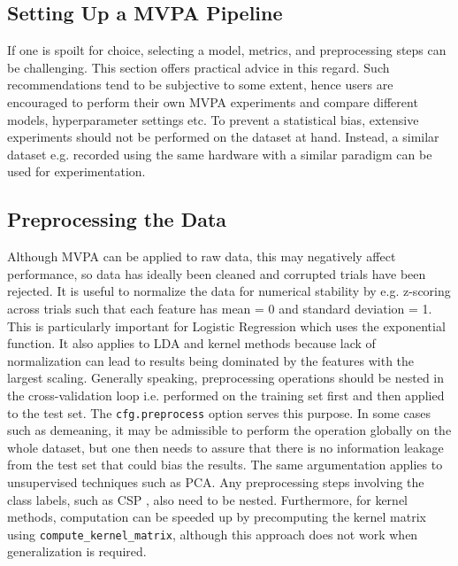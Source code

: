 \documentclass[utf8]{frontiersSCNS} %
\newcommand{\ttt}[1]{\texttt{#1}}
\begin{document}

\subsection{Setting Up a MVPA Pipeline}

If one is spoilt for choice, selecting  a model, metrics, and preprocessing steps can be challenging. This section offers practical advice in this regard. Such recommendations tend to be subjective to some extent, hence users are encouraged to perform their own MVPA experiments and compare different models, hyperparameter settings etc. To prevent a statistical bias, extensive experiments should not be performed on the dataset at hand. Instead, a similar dataset e.g. recorded using the same hardware with a similar paradigm can be used for experimentation.\\

\subsection{Preprocessing the Data} 

Although MVPA can be applied to raw data, this may negatively affect performance, so data has ideally been cleaned and corrupted trials have been rejected. It is useful to normalize the data for numerical stability by e.g. z-scoring across trials such that each feature has mean = 0 and standard deviation = 1. This is particularly important for Logistic Regression which uses the exponential function. It also applies to LDA and kernel methods because lack of normalization can lead to results being dominated by the features with the largest scaling. Generally speaking, preprocessing operations should be nested in the cross-validation loop i.e. performed on the training set first and then applied to the test set. The \ttt{cfg.preprocess} option serves this purpose. In some cases such as demeaning, it may be admissible to perform the operation globally on the whole dataset, but one then needs to assure that there is no information leakage from the test set that could bias the results. The same argumentation applies to unsupervised techniques such as PCA. Any preprocessing steps involving the class labels, such as CSP \citep{Blankertz2008a}, also need to be nested. Furthermore, for kernel methods, computation can be speeded up by precomputing the kernel matrix using \ttt{compute\_kernel\_matrix}, although this approach does not work when generalization is required.
\end{document}
